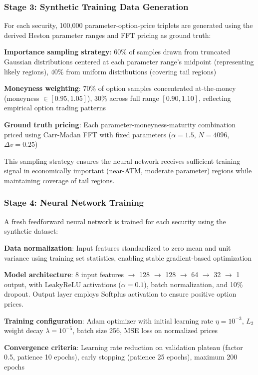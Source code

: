\documentclass[12pt,a4paper]{article}
\begin{document}
\subsubsection{Stage 3: Synthetic Training Data Generation}

For each security, 100,000 parameter-option-price triplets are generated using the derived Heston parameter ranges and FFT pricing as ground truth:

\textbf{Importance sampling strategy}: 60\% of samples drawn from truncated Gaussian distributions centered at each parameter range's midpoint (representing likely regions), 40\% from uniform distributions (covering tail regions)

\textbf{Moneyness weighting}: 70\% of option samples concentrated at-the-money (moneyness $\in [0.95, 1.05]$), 30\% across full range $[0.90, 1.10]$, reflecting empirical option trading patterns

\textbf{Ground truth pricing}: Each parameter-moneyness-maturity combination priced using Carr-Madan FFT with fixed parameters ($\alpha=1.5$, $N=4096$, $\Delta v=0.25$)

This sampling strategy ensures the neural network receives sufficient training signal in economically important (near-ATM, moderate parameter) regions while maintaining coverage of tail regions.

\subsubsection{Stage 4: Neural Network Training}

A fresh feedforward neural network is trained for each security using the synthetic dataset:

\textbf{Data normalization}: Input features standardized to zero mean and unit variance using training set statistics, enabling stable gradient-based optimization

\textbf{Model architecture}: 8 input features $\to$ 128 $\to$ 128 $\to$ 64 $\to$ 32 $\to$ 1 output, with LeakyReLU activations ($\alpha=0.1$), batch normalization, and 10\% dropout. Output layer employs Softplus activation to ensure positive option prices.

\textbf{Training configuration}: Adam optimizer with initial learning rate $\eta=10^{-3}$, $L_2$ weight decay $\lambda=10^{-5}$, batch size 256, MSE loss on normalized prices

\textbf{Convergence criteria}: Learning rate reduction on validation plateau (factor 0.5, patience 10 epochs), early stopping (patience 25 epochs), maximum 200 epochs
\end{document}
